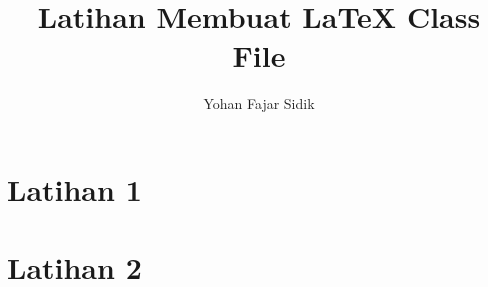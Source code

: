 \documentclass[12pt,a4paper,oneside]{yohan_article}
\title{Latihan Membuat LaTeX Class File}
\author{Yohan Fajar Sidik}
\begin{document}
\maketitle
	
\section{Latihan 1}
\blindtext

\section{Latihan 2}
\blindtext	
	
\end{document}
